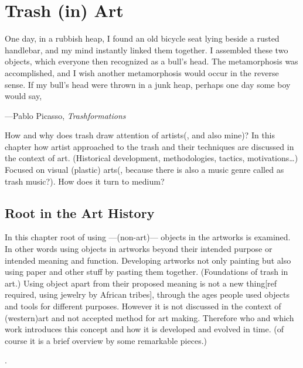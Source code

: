 \chapter{Trash (in) Art}

\epigraph{One day, in a rubbish heap, I found an old bicycle seat lying beside a rusted handlebar, and my mind instantly linked them together. I assembled these two objects, which everyone then recognized as a bull’s head. The metamorphosis was accomplished, and I wish another metamorphosis would occur in the reverse sense. If my bull’s head were thrown in a junk heap, perhaps one day some boy would say, }{\hfill ---Pablo Picasso, \textit{Trashformations}}

How and why does trash draw attention of artists(, and also mine)? In this chapter how artist approached to the trash and their techniques are discussed in the context of art. (Historical development, methodologies, tactics, motivations\ldots) Focused on visual (plastic) arts(, because there is also a music genre called as trash music?). How does it turn to medium?



\section{Root in the Art History}
In this chapter root of using ---(non-art)--- objects in the artworks is examined. In other words using objects in artworks beyond their intended purpose or intended meaning and function. Developing artworks not only painting but also using paper and other stuff by pasting them together. (Foundations of trash in art.) Using object apart from their proposed meaning is not a new thing[ref required, using jewelry by African tribes], through the ages people used objects and tools for different purposes. However it is not discussed in the context of (western)art and not accepted method for art making. Therefore who and which work introduces this concept and how it is developed and evolved in time. (of course it is a brief overview by some remarkable pieces.)

  \cite{tauxe2012encyclopedia}.

